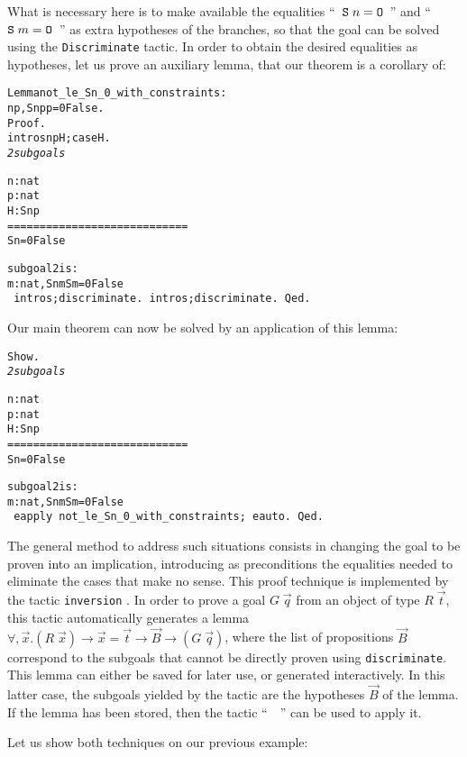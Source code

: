 \documentclass[11pt]{article}
\newcommand{\refmancite}[1]{{}}
\begin{document}
\noindent What is necessary here is to make available the equalities
``~$\texttt{S}\;n = \texttt{O}$~'' and ``~$\texttt{S}\;m = \texttt{O}$~''
 as extra hypotheses of the
branches, so that the goal can be solved using the
\texttt{Discriminate} tactic. In order to obtain the desired
equalities as hypotheses, let us prove an auxiliary lemma, that our
theorem is a corollary of:

\begin{alltt}
 Lemma not_le_Sn_0_with_constraints :
  {\prodsym} n p , S n {\coqle} p {\arrow}  p = 0 {\arrow} False.
  Proof.
   intros n p H; case H .
\it
2 subgoals

  n : nat
  p : nat
  H : S n {\coqle} p
  ============================
   S n = 0 {\arrow} False

subgoal 2 is:
 {\prodsym} m : nat, S n {\coqle} m {\arrow} S m = 0 {\arrow} False
\tt
 intros;discriminate.
 intros;discriminate.
Qed.
\end{alltt}
\noindent Our main theorem can now be solved by an application of this lemma:
\begin{alltt}
Show.
\it
2 subgoals

  n : nat
  p : nat
  H : S n {\coqle} p
  ============================
   S n = 0 {\arrow} False

subgoal 2 is:
 {\prodsym} m : nat, S n {\coqle} m {\arrow} S m = 0 {\arrow} False
\tt
 eapply not_le_Sn_0_with_constraints; eauto.
Qed.
\end{alltt}


The general method to address such situations consists in changing the
goal to be proven into an implication, introducing as preconditions
the equalities needed to eliminate the cases that make no
sense. This proof technique is implemented by the tactic
\texttt{inversion} \refmancite{Section \ref{Inversion}}. In order
to prove a goal $G\;\vec{q}$ from an object of type $R\;\vec{t}$,
this tactic automatically generates a lemma $\forall, \vec{x}.
(R\;\vec{x}) \rightarrow \vec{x}=\vec{t}\rightarrow \vec{B}\rightarrow
(G\;\vec{q})$, where the list of propositions $\vec{B}$ correspond to
the subgoals that cannot be directly proven using
\texttt{discriminate}. This lemma can either be saved for later
use, or generated interactively. In this latter case, the subgoals
yielded by the tactic are the hypotheses $\vec{B}$ of the lemma. If the
lemma has been stored, then the tactic \linebreak
 ``~~'' can be
used to apply it.

Let us show both techniques on our previous example:
\end{document}
